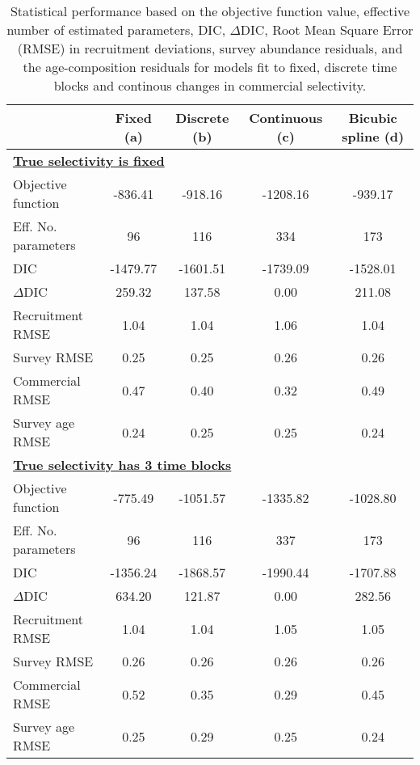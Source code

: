 \begin{table*}[!tbh]
	\caption{Statistical performance based on the objective function value, effective number of estimated parameters, DIC, $\Delta$DIC, Root Mean Square Error (RMSE) in recruitment deviations, survey abundance residuals, and the age-composition residuals for models fit to fixed, discrete time blocks and continous changes in commercial selectivity.}
	\label{tab:statisticalPeformance}
	\begin{center}
		\begin{tabular}{l|cccc}
		\hline

		\hline
		\textbf{} & \textbf{Fixed (a)} & \textbf{Discrete (b)} & \textbf{Continuous (c)} & \textbf{Bicubic spline (d)} \\
		\hline

		
	    \multicolumn{5}{l}{\textbf{\underline{True selectivity is fixed}}}\\
		Objective function            &  -836.41 &  -918.16 & -1208.16 &  -939.17 \\
		Eff. No. parameters             &    96 &   116 &   334 &   173 \\
		DIC              & -1479.77 & -1601.51 & -1739.09 & -1528.01 \\
		$\Delta$DIC         &   259.32 &   137.58 &     0.00 &   211.08 \\
		Recruitment RMSE &     1.04 &     1.04 &     1.06 &     1.04 \\
		Survey RMSE      &     0.25 &     0.25 &     0.26 &     0.26 \\
		Commercial RMSE         &     0.47 &     0.40 &     0.32 &     0.49 \\
		Survey age RMSE         &     0.24 &     0.25 &     0.25 &     0.24 \\
		
		\hline
		\multicolumn{5}{l}{\textbf{\underline{True selectivity has 3 time blocks}}}\\
		Objective function            &  -775.49 & -1051.57 & -1335.82 & -1028.80 \\
		Eff. No. parameters             &    96 &   116 &   337 &   173 \\
		DIC              & -1356.24 & -1868.57 & -1990.44 & -1707.88 \\
		$\Delta$DIC         &   634.20 &   121.87 &     0.00 &   282.56 \\
		Recruitment RMSE &     1.04 &     1.04 &     1.05 &     1.05 \\
		Survey RMSE      &     0.26 &     0.26 &     0.26 &     0.26 \\
		Commercial RMSE         &     0.52 &     0.35 &     0.29 &     0.45 \\
		Survey age RMSE         &     0.25 &     0.29 &     0.25 &     0.24 \\


\end{tabular}
\end{center}
\end{table*}

